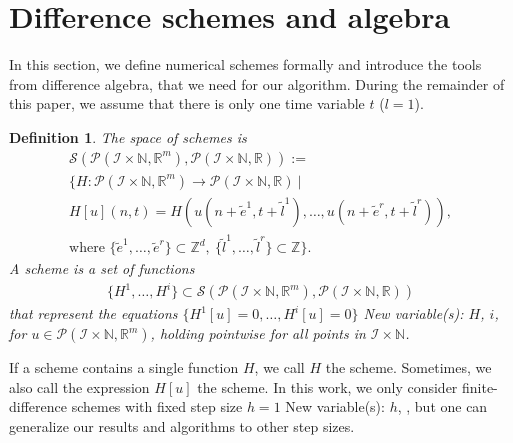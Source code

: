 \documentclass[sigconf,twocolumn]{acmart}
\newcommand{\1}{{\chi}}
\numberwithin{equation}{section}
\theoremstyle{thmlemcorr}
\numberwithin{theorem}{section}
\theoremstyle{thmlemcorr*}
\theoremstyle{defi}
\newtheorem{definition}[theorem]{Definition}
\theoremstyle{remexample}
\theoremstyle{ass}
\begin{document}
\section{Difference schemes and algebra}
\label{algodetec}
In this section, we define numerical schemes formally and introduce the tools from difference algebra, that we need for our algorithm.
During the remainder of this paper, we assume that there is only one time variable \(t\) (\(l=1\)).
\begin{definition}
	The space of schemes is
	\begin{gather*}
		\mathcal{S}(\mathcal{P}({\mathcal{I}}\times{\mathbb{N}},{\mathbb{R}}^m),\mathcal{P}({\mathcal{I}}\times{\mathbb{N}},{\mathbb{R}})):=\\
		\Bigg\{H:\mathcal{P}({\mathcal{I}}\times{\mathbb{N}},{\mathbb{R}}^m)\rightarrow\mathcal{P}({\mathcal{I}}\times{\mathbb{N}},{\mathbb{R}})\ \Bigg|\\
			H[u](n,t)=H(u(n+\tilde{e}^1,t+\tilde{l}^1),\ldots,u(n+\tilde{e}^r,t+\tilde{l}^r)),\\
			\text{where }
		\{\tilde{e}^1,\ldots,\tilde{e}^r\}\subset{\mathbb{Z}}^d,\ \{\tilde{l}^1,\ldots,\tilde{l}^r\}\subset{\mathbb{Z}}
		\Bigg\}.
	\end{gather*}
	A scheme is a set of functions
	\begin{gather*}
		\{H^1,\ldots,H^i\}\subset\mathcal{S}(\mathcal{P}({\mathcal{I}}\times{\mathbb{N}},{\mathbb{R}}^m),\mathcal{P}({\mathcal{I}}\times{\mathbb{N}},{\mathbb{R}}))
	\end{gather*}
	that represent the equations \(\{H^1[u]=0,\ldots,H^i[u]=0\}\)
{\color{blue} New variable(s): \(H\), \(i\),  }
 for \(u\in\mathcal{P}({\mathcal{I}}\times{\mathbb{N}},{\mathbb{R}}^m)\), holding pointwise for all points in \({\mathcal{I}}\times{\mathbb{N}}\).
\end{definition}
If a scheme contains a single function \(H\), we call \(H\) the scheme. Sometimes, we also call the expression \(H[u]\) the scheme.
In this work, we only consider finite-difference schemes with fixed step size \(h=1\)
{\color{blue} New variable(s): \(h\),  }
, but one can generalize our results and algorithms to other step sizes.
\end{document}

